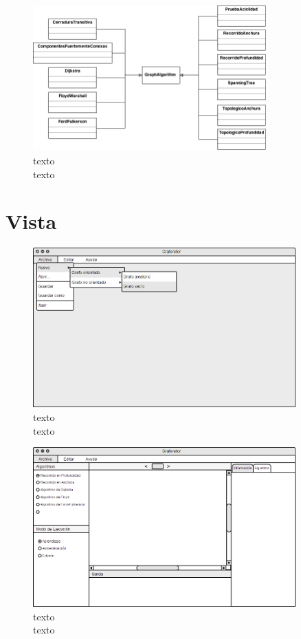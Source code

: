 \documentclass{book}
\begin{document}
\begin{figure}[H]
	\centering
	\includegraphics[width=0.8\textwidth]{images/01-04.png}
	\medskip
	\caption{texto \\ texto}
	\medskip
\end{figure}
\bigskip



\section{Vista}


\begin{figure}[H]
	\centering
	\includegraphics[width=0.9\textwidth]{images/02-01.png}
	\medskip
	\caption{texto \\ texto}
	\medskip
\end{figure}
\bigskip


\begin{figure}[H]
	\centering
	\includegraphics[width=0.9\textwidth]{images/02-02.png}
	\medskip
	\caption{texto \\ texto}
	\medskip
\end{figure}
\bigskip
\end{document}
